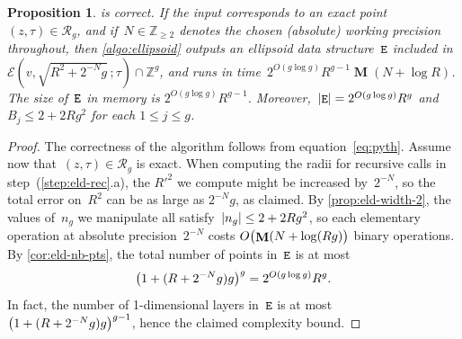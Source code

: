 \documentclass[12pt,oneside]{amsart}
\numberwithin{equation}{section}
\newtheorem{prop}[equation]{Proposition}
\theoremstyle{definition}
\newcommand{\Z}{\mathbb{Z}}
\newcommand{\red}{\mathcal{R}}
\newcommand{\eld}[3]{\ensuremath{\mathcal{E}(#1, #2\,; #3)}}
\DeclareMathOperator{\E}{\tt E}
\DeclareMathOperator{\Mul}{\mathbf{M}}
\DeclarePairedDelimiter{\abs}{|}{|}
\DeclarePairedDelimiter{\paren}{(}{)}
\begin{document}
\begin{prop}
  \label{prop:ellipsoid}
   is correct. If the input corresponds to an exact
  point~$(z,\tau)\in \red_g$, and if~$N\in \Z_{\geq 2}$ denotes the chosen
  (absolute) working precision throughout, then \cref{algo:ellipsoid} outputs
  an ellipsoid data structure~$\E$ included in
  $\eld{v}{\sqrt{R^2 + 2^{-N}g}}{\tau}\cap\Z^g$, and runs in
  time~$2^{O(g\log g)}R^{g-1}\Mul(N + \log R)$. The size of~$\E$ in memory is
  $2^{O(g\log g)} R^{g-1}$. Moreover,~$\abs{\E} = 2^{O(g\log g)} R^g$ and
  $B_j \leq 2 + 2Rg^2$ for each $1\leq j\leq g$.
\end{prop}

\begin{proof}
  The correctness of the algorithm follows from
  equation~\eqref{eq:pyth}. Assume now that~$(z,\tau)\in \red_g$ is exact. When
  computing the radii for recursive calls in step~(\ref{step:eld-rec}.a), the
  $R'^2$ we compute might be increased by~$2^{-N}$, so the total error on~$R^2$
  can be as large as $2^{-N}g$, as claimed. By \cref{prop:eld-width-2}, the
  values of~$n_g$ we manipulate all satisfy~$\abs{n_g}\leq 2 + 2Rg^2$, so each
  elementary operation at absolute precision~$2^{-N}$ costs
  $O\paren[\big]{\Mul(N + \log(Rg)}$ binary operations. By
  \cref{cor:eld-nb-pts}, the total number of points in~$\E$ is at most
  \begin{displaymath}
    \paren[\big]{1 + (R+2^{-N}g)g}^g = 2^{O(g\log g)} R^g.
  \end{displaymath}
  In fact, the number of 1-dimensional layers in~$\E$ is at most
  $\paren[\big]{1 + (R+2^{-N}g)g}^{g-1}$, hence the claimed complexity bound.
\end{proof}
\end{document}
